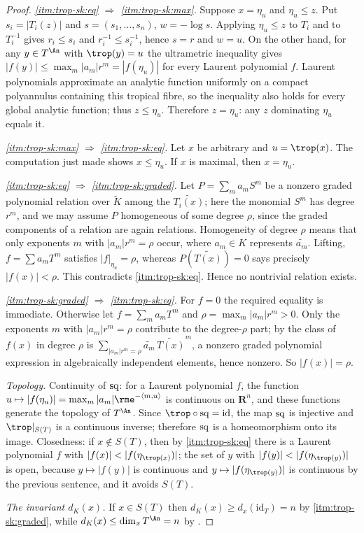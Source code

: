 \begin{proof}
\emph{\cref{itm:trop-sk:eq} $\Rightarrow$ \cref{itm:trop-sk:max}.} Suppose
$x=\eta_u$ and $\eta_u\le z$. Put $s_i=|T_i(z)|$ and $s=(s_1,\ldots,s_n)$,
$w=-\log s$. Applying $\eta_u\le z$ to $T_i$ and to $T_i^{-1}$ gives
$r_i\le s_i$ and $r_i^{-1}\le s_i^{-1}$, hence $s=r$ and $w=u$. On the other
hand, for any $y\in T^{\An}$ with $\trop(y)=u$ the ultrametric inequality
gives $|f(y)|\le\max_m|a_m|r^m=|f(\eta_u)|$ for every Laurent polynomial
$f$. Laurent polynomials approximate an analytic function uniformly on a
compact polyannulus containing this tropical fibre, so the inequality also
holds for every global analytic function; thus $z\le\eta_u$.
Therefore $z=\eta_u$: any $z$ dominating $\eta_u$ equals it.

\emph{\cref{itm:trop-sk:max} $\Rightarrow$ \cref{itm:trop-sk:eq}.} Let
$x$ be arbitrary and $u=\trop(x)$. The computation just made shows
$x\le\eta_u$. If $x$ is maximal, then $x=\eta_u$.

\emph{\cref{itm:trop-sk:eq} $\Rightarrow$ \cref{itm:trop-sk:graded}.} Let
$P=\sum_ma_mS^m$ be a nonzero graded polynomial relation over
$\widetilde K$ among the $\widetilde{T_i(x)}$; here the monomial $S^m$ has
degree $r^m$, and we may assume $P$ homogeneous of some degree $\rho$,
since the graded components of a relation are again relations. Homogeneity
of degree $\rho$ means that only exponents $m$ with $|a_m|r^m=\rho$ occur,
where $a_m\in K$ represents $\widetilde{a_m}$. Lifting, $f=\sum a_mT^m$
satisfies $|f|_{\eta_u}=\rho$, whereas $P(\widetilde{T(x)})=0$ says
precisely $|f(x)|<\rho$. This contradicts \cref{itm:trop-sk:eq}. Hence no
nontrivial relation exists.

\emph{\cref{itm:trop-sk:graded} $\Rightarrow$ \cref{itm:trop-sk:eq}.}
For $f=0$ the required equality is immediate. Otherwise let
$f=\sum_ma_mT^m$ and $\rho=\max_m|a_m|r^m>0$. Only the exponents $m$
with $|a_m|r^m=\rho$ contribute to the degree-$\rho$ part; by
 the class of $f(x)$ in degree $\rho$ is
$\sum_{|a_m|r^m=\rho}\widetilde{a_m}\,\widetilde{T(x)}^m$, a nonzero graded
polynomial expression in algebraically independent elements, hence nonzero.
So $|f(x)|=\rho$.

\emph{Topology.} Continuity of $\operatorname{sq}$: for a Laurent polynomial $f$, the
function $u\mapsto|f(\eta_u)|=\max_m|a_m|\rme^{-\langle m,u\rangle}$ is
continuous on $\mathbf R^n$, and these functions generate the topology of
$T^{\An}$. Since $\trop\circ\sq=\mathrm{id}$, the map $\operatorname{sq}$ is injective and
$\trop|_{S(T)}$ is a continuous inverse; therefore $\operatorname{sq}$ is a homeomorphism
onto its image. Closedness: if $x\notin S(T)$, then by
\cref{itm:trop-sk:eq} there is a Laurent polynomial $f$ with
$|f(x)|<|f(\eta_{\trop(x)})|$; the set of $y$ with
$|f(y)|<|f(\eta_{\trop(y)})|$ is open, because $y\mapsto|f(y)|$ is
continuous and $y\mapsto|f(\eta_{\trop(y)})|$ is continuous by the previous
sentence, and it avoids $S(T)$.

\emph{The invariant $d_K(x)$.} If $x\in S(T)$ then
$d_K(x)\ge d_x(\mathrm{id}_T)=n$ by \cref{itm:trop-sk:graded}, while
$d_K(x)\le\dim_xT^{\An}=n$ by .
\end{proof}


